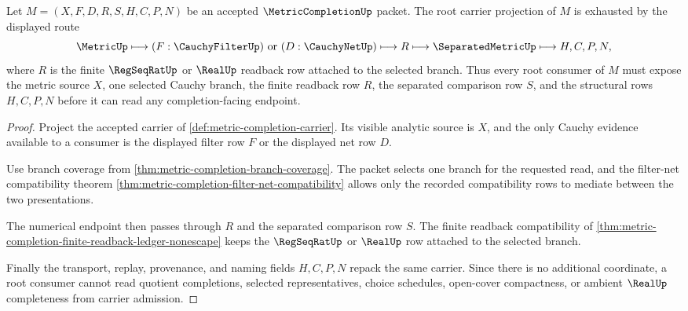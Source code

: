 \begin{theorem}
\label{thm:metriccompletion-root-obligation-carrier}
Let $M=(X,F,D,R,S,H,C,P,N)$ be an accepted $\MetricCompletionUp$ packet. The root carrier projection of $M$ is exhausted by the displayed route
$$
\MetricUp\longmapsto (F:\CauchyFilterUp)\ \text{or}\ (D:\CauchyNetUp)\longmapsto R\longmapsto \SeparatedMetricUp\longmapsto H,C,P,N ,
$$
where $R$ is the finite $\RegSeqRatUp$ or $\RealUp$ readback row attached to the selected branch. Thus every root consumer of $M$ must expose the metric source $X$, one selected Cauchy branch, the finite readback row $R$, the separated comparison row $S$, and the structural rows $H,C,P,N$ before it can read any completion-facing endpoint.
\end{theorem}
\begin{proof}
Project the accepted carrier of \autoref{def:metric-completion-carrier}. Its visible analytic source is $X$, and the only Cauchy evidence available to a consumer is the displayed filter row $F$ or the displayed net row $D$.

Use branch coverage from \autoref{thm:metric-completion-branch-coverage}. The packet selects one branch for the requested read, and the filter-net compatibility theorem \autoref{thm:metric-completion-filter-net-compatibility} allows only the recorded compatibility rows to mediate between the two presentations.

The numerical endpoint then passes through $R$ and the separated comparison row $S$. The finite readback compatibility of \autoref{thm:metric-completion-finite-readback-ledger-nonescape} keeps the $\RegSeqRatUp$ or $\RealUp$ row attached to the selected branch.

Finally the transport, replay, provenance, and naming fields $H,C,P,N$ repack the same carrier. Since there is no additional coordinate, a root consumer cannot read quotient completions, selected representatives, choice schedules, open-cover compactness, or ambient $\RealUp$ completeness from carrier admission.
\end{proof}

